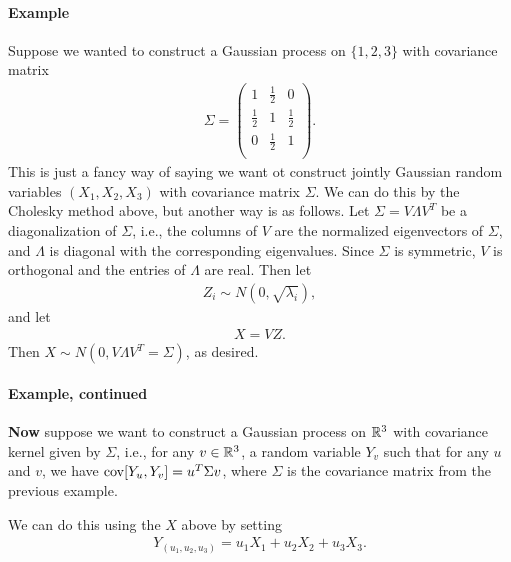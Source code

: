 \documentclass[../../../Master/AppliedStochastics.tex]{subfiles}
\begin{document}
\paragraph{Example} 
    Suppose we wanted to construct a Gaussian process on $\{1,2,3\}$ with covariance matrix 
        $$\begin{aligned}
            \Sigma=
                \left(\begin{array}{ccc}
                1 & \frac{1}{2} & 0\\
                \frac{1}{2} & 1 & \frac{1}{2}\\
                0 & \frac{1}{2} & 1\\
                \end{array}\right).
        \end{aligned}$$
        This is just a fancy way of saying we want ot construct jointly Gaussian random variables $(X_1, X_2, X_3)$
        with covariance matrix $\Sigma$.
        We can do this by the Cholesky method above,
        but another way is as follows.
        Let $\Sigma = V \Lambda V^T$ be a diagonalization of $\Sigma$,
        i.e., the columns of $V$ are the normalized eigenvectors of $\Sigma$,
        and $\Lambda$ is diagonal with the corresponding eigenvalues.
        Since $\Sigma$ is symmetric, $V$ is orthogonal and the entries of $\Lambda$ are real.
        Then let
        $$\begin{aligned}
            Z_i \sim N(0, \sqrt{\lambda_i}),
        \end{aligned}$$
        and let 
        $$\begin{aligned}
            X = V Z.
        \end{aligned}$$
        Then $X \sim N(0, V \Lambda V^T = \Sigma)$, as desired.


\paragraph{Example, continued}

        \textbf{Now} suppose we want to construct a Gaussian process on $\mathbb{R}^3$ with covariance kernel given by $\Sigma$,
        i.e., for any $v \in \mathbb{R}^3$, a random variable $Y_v$
        such that for any $u$ and $v$, we have $\operatorname{cov}[Y_u,Y_v]=u^T \Sigma v$,
        where $\Sigma$ is the covariance matrix from the previous example.

        We can do this using the $X$ above
        by setting
        $$\begin{aligned}
            Y_{(u_1, u_2, u_3)} = u_1 X_1 + u_2 X_2 + u_3 X_3 .
        \end{aligned}$$




%
\end{document}
